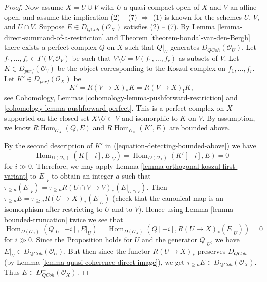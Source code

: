 \documentclass{stacks-project}
\theoremstyle{plain}
\theoremstyle{definition}
\theoremstyle{remark}
\numberwithin{equation}{subsection}
\def\Hom{\mathop{\mathrm{Hom}}\nolimits}
\def\QCoh{\mathit{QCoh}}
\begin{document}
\begin{proof}
\medskip\noindent
Now assume $X = U \cup V$ with $U$ a quasi-compact open of $X$ and
$V$ an affine open, and assume the implication (2) -- (7) $\Rightarrow$ (1)
is known for the schemes $U$, $V$, and $U \cap V$.
Suppose $E \in D_\QCoh(\mathcal{O}_X)$ satisfies (2) -- (7).
By Lemma \ref{lemma-direct-summand-of-a-restriction} and
Theorem \ref{theorem-bondal-van-den-Bergh} there exists a perfect
complex $Q$ on $X$ such that $Q|_U$ generates $D_\QCoh (\mathcal{O}_U)$. 
Let $f_1, \dots , f_r \in \Gamma (V, \mathcal{O}_V)$
be such that $V \setminus U = V(f_1, \dots , f_r)$ as subsets of
$V$. Let $K \in D_{perf}(\mathcal{O}_V)$ be the object
corresponding to the Koszul complex on $f_1, \dots , f_r$.
Let $K' \in D_{perf}(\mathcal{O}_X)$ be
\begin{equation}
\label{equation-detecting-bounded-above}
K' = R (V \to X)_* K = R (V \to X)_! K,
\end{equation}
see Cohomology, Lemmas \ref{cohomology-lemma-pushforward-restriction} and
\ref{cohomology-lemma-pushforward-perfect}. This is a perfect
complex on $X$ supported on the closed set $X \setminus U \subset V$
and isomorphic to $K$ on $V$. By assumption, we know
$R\Hom_{\mathcal{O}_X}(Q, E)$ and
$R\Hom_{\mathcal{O}_X}(K', E)$ are bounded above.

\medskip\noindent
By the second description of $K'$ in (\ref{equation-detecting-bounded-above})
we have
$$
\Hom_{D(\mathcal{O}_V)}(K[-i], E|_V) = \Hom_{D(\mathcal{O}_X)}(K'[-i], E) = 0
$$
for $i \gg 0$. Therefore, we may apply
Lemma \ref{lemma-orthogonal-koszul-first-variant} to $E|_V$ to
obtain an integer $a$ such that
$\tau_{\geq a}(E|_V) = \tau_{\geq a} R (U \cap V \to V)_* (E|_{U \cap V})$.
Then $\tau_{\geq a} E = \tau_{\geq a} R (U \to X)_* (E |_U)$
(check that the canonical map is an isomorphism after restricting to
$U$ and to $V$). Hence using Lemma \ref{lemma-bounded-truncation}
twice we see that
$$
\Hom_{D(\mathcal{O}_U)}(Q|_U [-i], E|_U) =
\Hom_{D(\mathcal{O}_X)}(Q[-i], R (U \to X)_* (E|_U)) = 0
$$
for $i \gg 0$. Since the Proposition holds for $U$ and the generator
$Q|_U$, we have $E|_U \in D^-_\QCoh(\mathcal{O}_U)$. But then since
the functor $R (U \to X)_*$ preserves $D^-_\QCoh$ 
(by Lemma \ref{lemma-quasi-coherence-direct-image}), we get
$\tau_{\geq a}E \in D^-_\QCoh(\mathcal{O}_X)$. Thus 
$E \in D^-_\QCoh (\mathcal{O}_X)$. 
\end{proof}
\end{document}
